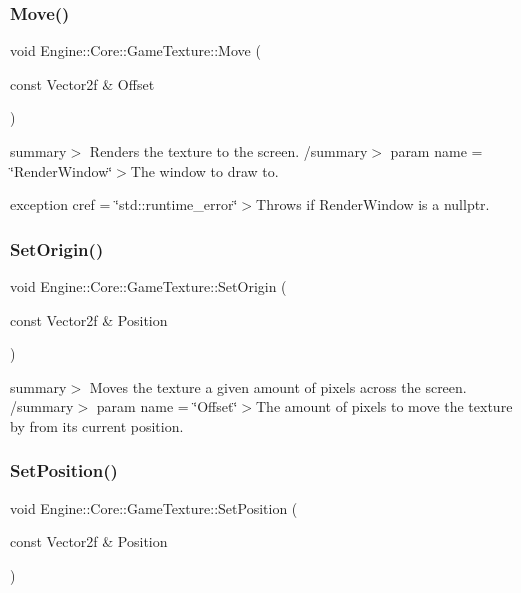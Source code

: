 \subsubsection{\texorpdfstring{Move()}{Move()}}
{\footnotesize\ttfamily void Engine\+::\+Core\+::\+Game\+Texture\+::\+Move (\begin{DoxyParamCaption}\item[{const Vector2f \&}]{Offset }\end{DoxyParamCaption})}

summary$>$ Renders the texture to the screen. /summary$>$ param name = \char`\"{}\+Render\+Window\char`\"{}$>$The window to draw to.

exception cref = \char`\"{}std\+::runtime\+\_\+error\char`\"{}$>$Throws if Render\+Window is a nullptr.\mbox{\label{class_engine_1_1_core_1_1_game_texture_aa01df5d689abf48b1d442da329485eeb}} 
\subsubsection{\texorpdfstring{Set\+Origin()}{SetOrigin()}}
{\footnotesize\ttfamily void Engine\+::\+Core\+::\+Game\+Texture\+::\+Set\+Origin (\begin{DoxyParamCaption}\item[{const Vector2f \&}]{Position }\end{DoxyParamCaption})}

summary$>$ Moves the texture a given amount of pixels across the screen. /summary$>$ param name = \char`\"{}\+Offset\char`\"{}$>$The amount of pixels to move the texture by from its current position.\mbox{\label{class_engine_1_1_core_1_1_game_texture_ae1f94e0f1b86e99ed4508ccdda4872d6}} 
\subsubsection{\texorpdfstring{Set\+Position()}{SetPosition()}}
{\footnotesize\ttfamily void Engine\+::\+Core\+::\+Game\+Texture\+::\+Set\+Position (\begin{DoxyParamCaption}\item[{const Vector2f \&}]{Position }\end{DoxyParamCaption})}

